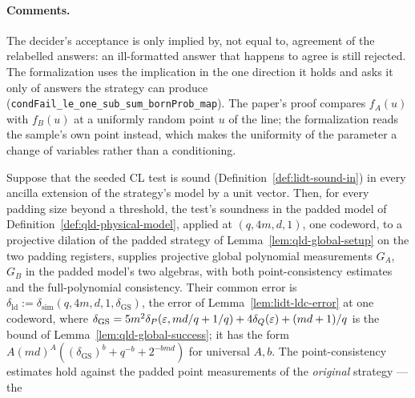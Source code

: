 \paragraph{Comments.} The decider's acceptance is only implied by, not equal to, agreement of the
relabelled answers: an ill-formatted answer that happens to agree is still rejected. The
formalization uses the implication in the one direction it holds and asks it only of answers the
strategy can produce (\texttt{condFail\_le\_one\_sub\_sum\_bornProb\_map}). The paper's proof
compares $f_A(u)$ with $f_B(u)$ at a uniformly random point $u$ of the line; the formalization
reads the sample's own point instead, which makes the uniformity of the parameter a change of
variables rather than a conditioning.

\begin{lemma}
\label{lem:qld-global-pvm}
\leanok
Suppose that the seeded CL test is sound (Definition~\ref{def:lidt-sound-in}) in every ancilla
extension of the strategy's model by a unit vector. Then, for every padding size beyond a
threshold, the test's soundness in the padded model of Definition~\ref{def:qld-physical-model},
applied at $(q,4m,d,1)$, one codeword, to a projective dilation of the padded strategy of
Lemma~\ref{lem:qld-global-setup} on the two padding registers, supplies projective global
polynomial measurements $G_A$, $G_B$ in the padded model's two algebras, with both
point-consistency estimates and the full-polynomial consistency. Their common error is
$\delta_{\mathrm{ld}} := \delta_{\mathrm{sim}}(q, 4m, d, 1, \delta_{\mathrm{GS}})$, the error of
Lemma~\ref{lem:lidt-ldc-error} at one codeword, where
$\delta_{\mathrm{GS}} = 5 m^2 \delta_P(\varepsilon, md/q + 1/q) + 4 \delta_Q(\varepsilon) + (md+1)/q$ is the
bound of Lemma~\ref{lem:qld-global-success}; it has the form
$A(md)^A((\delta_{\mathrm{GS}})^b+q^{-b}+2^{-bmd})$ for universal $A,b$. The point-consistency
estimates hold against the padded point measurements of the \emph{original} strategy --- the

\end{lemma}
